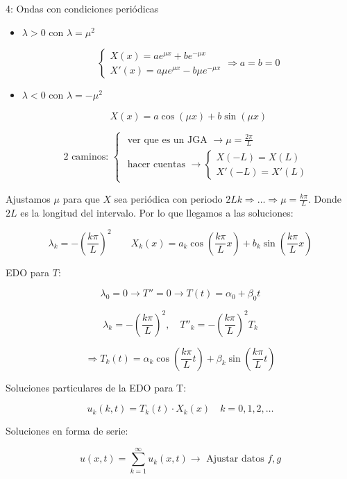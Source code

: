 \begin{example}{4: Ondas con condiciones periódicas}
\begin{itemize}
				\item $\lambda > 0$ con $\lambda = \mu^2$

					\[\left\{\begin{array}{l}
						X(x) = ae^{\mu x} + b e^{-\mu x} \\
						X'(x) = a\mu e^{\mu x} - b \mu e^{-\mu x}
					\end{array}
					\right. \Rightarrow a = b = 0 \]


				\item $\lambda < 0$ con $\lambda = -\mu^2$

					\[ X (x) = a \cos (\mu x) + b \sin (\mu x) \]

					\[\text{2 caminos: }\left\{\begin{array}{l}
						\text{ ver que es un JGA }\rightarrow \mu = \frac{2\pi}{L} \\
						\text{ hacer cuentas }\rightarrow \left\{ \begin{array}{l}
							X(-L) = X(L) \\
							X'(-L) = X'(L)
						\end{array} \right.
					\end{array}
					\right. \]
			\end{itemize}

			Ajustamos $\mu$ para que $X$ sea periódica con periodo $2L k \Rightarrow … \Rightarrow \mu = \frac{k \pi}{L}$. Donde $2L$ es la longitud del intervalo. Por lo que llegamos a las soluciones:

			\[
			\lambda_k = -\left(\frac{k\pi}{L}\right)^2\quad\quad X_k(x) = a_k \cos \left( \frac{k\pi}{L} x \right) + b_k \sin \left( \frac{k\pi}{L} x \right)
			\]

			EDO para $T$:

			\[ \lambda_0 = 0 \rightarrow T''=0 \rightarrow T(t) = \alpha_0 + \beta_0 t\]

			\[ \lambda_k = - \left( \frac{k\pi}{L} \right)^2, \quad T''_k = - \left( \frac{k\pi}{L} \right)^2 T_k \]

			\[\Rightarrow T_k(t) = \alpha_k \cos \left( \frac{k\pi}{L} t \right) + \beta_k \sin \left( \frac{k\pi}{L} t \right) \]

			Soluciones particulares de la EDO para T:

			\[u_k (k,t) = T_k(t) \cdot X_k(x) \quad k = 0,1,2,… \]


			Soluciones en forma de serie:

			\[u(x,t) = \sum_{k=1}^{\infty} u_k (x,t) \rightarrow \text{ Ajustar datos } f,g \]


\end{example}

